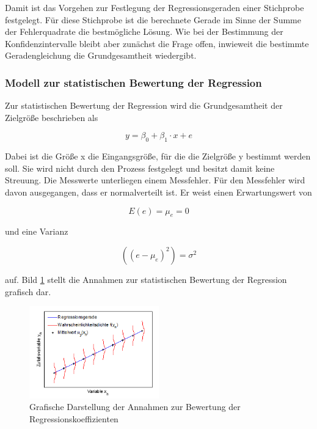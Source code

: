\noindent Damit ist das Vorgehen zur Festlegung der Regressionsgeraden einer Stichprobe festgelegt. F\"{u}r diese Stichprobe ist die berechnete Gerade im Sinne der Summe der Fehlerquadrate die bestm\"{o}gliche L\"{o}sung. Wie bei der Bestimmung der Konfidenzintervalle bleibt aber zun\"{a}chst die Frage offen, inwieweit die bestimmte Geradengleichung die Grundgesamtheit wiedergibt.

\subsubsection{Modell zur statistischen Bewertung der Regression}

\noindent Zur statistischen Bewertung der Regression wird die Grundgesamtheit der Zielgr\"{o}{\ss}e beschrieben als

\begin{equation}\label{eq:twelvetwentyfour}
y=\beta _{0} +\beta _{1} \cdot x+e
\end{equation}

\noindent Dabei ist die Gr\"{o}{\ss}e x die Eingangsgr\"{o}{\ss}e, f\"{u}r die die Zielgr\"{o}{\ss}e y bestimmt werden soll. Sie wird nicht durch den Prozess festgelegt und besitzt damit keine Streuung. Die Messwerte unterliegen einem Messfehler. F\"{u}r den Messfehler wird davon ausgegangen, dass er normalverteilt ist. Er weist einen Erwartungswert von 

\begin{equation}\label{eq:twelvetwentyfive}
E(e)=\mu _{e} =0
\end{equation}

\noindent und eine Varianz 

\begin{equation}\label{eq:twelvetwentysix}
\left((e-\mu _{e})^{2} \right)=\sigma ^{2}
\end{equation}

\noindent auf. Bild \ref{fig:AnsatzHerleitungKonfidenzbereich} stellt die Annahmen zur statistischen Bewertung der Regression grafisch dar.

\clearpage

\noindent 
\begin{figure}[H]
  \centerline{\includegraphics[width=0.5\textwidth]{Kapitel12/Bilder/image5}}
  \caption{Grafische Darstellung der Annahmen zur Bewertung der Regressionskoeffizienten}
  \label{fig:AnsatzHerleitungKonfidenzbereich}
\end{figure}

